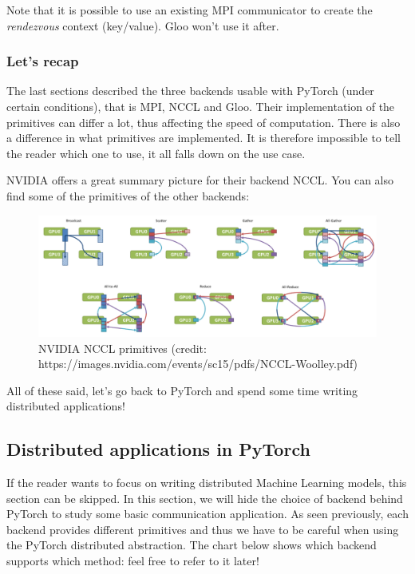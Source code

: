 \documentclass{article}
\begin{document}
Note that it is possible to use an existing MPI communicator to create the \emph{rendezvous} context (key/value). Gloo won't use it after.

\subsubsection{Let's recap}
The last sections described the three backends usable with PyTorch (under certain conditions), that is MPI, NCCL and Gloo. Their implementation of the primitives can differ a lot, thus affecting the speed of computation. There is also a difference in what primitives are implemented. It is therefore impossible to tell the reader which one to use, it all falls down on the use case.

NVIDIA offers a great summary picture for their backend NCCL. You can also find some of the primitives of the other backends:

\begin{figure}[h!]
  \center
  \includegraphics[width=0.7\linewidth]{images/2022-09-07-15-00-16.png}
  \caption{NVIDIA NCCL primitives (credit: https://images.nvidia.com/events/sc15/pdfs/NCCL-Woolley.pdf)}
\end{figure}
\FloatBarrier

All of these said, let's go back to PyTorch and spend some time writing distributed applications!

\subsection{Distributed applications in PyTorch}
If the reader wants to focus on writing distributed Machine Learning models, this section can be skipped. In this section, we will hide the choice of backend behind PyTorch to study some basic communication application. As seen previously, each backend provides different primitives and thus we have to be careful when using the PyTorch distributed abstraction. The chart below shows which backend supports which method: feel free to refer to it later!
\end{document}
